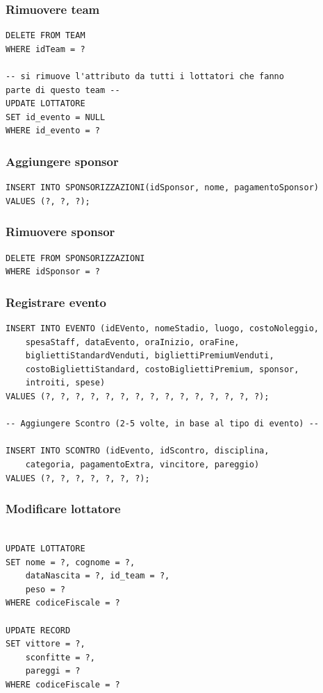 \documentclass[a4paper,12pt]{report}
\begin{document}
\subsubsection{Rimuovere team}
\begin{verbatim}
DELETE FROM TEAM 
WHERE idTeam = ?

-- si rimuove l'attributo da tutti i lottatori che fanno 
parte di questo team --
UPDATE LOTTATORE
SET id_evento = NULL
WHERE id_evento = ?
\end{verbatim}
\subsubsection{Aggiungere sponsor}
\begin{verbatim}
INSERT INTO SPONSORIZZAZIONI(idSponsor, nome, pagamentoSponsor)
VALUES (?, ?, ?);
\end{verbatim}
\subsubsection{Rimuovere sponsor}
\begin{verbatim}
DELETE FROM SPONSORIZZAZIONI
WHERE idSponsor = ?
\end{verbatim}
\subsubsection{Registrare evento}
\begin{verbatim}
INSERT INTO EVENTO (idEVento, nomeStadio, luogo, costoNoleggio,
    spesaStaff, dataEvento, oraInizio, oraFine, 
    bigliettiStandardVenduti, bigliettiPremiumVenduti, 
    costoBigliettiStandard, costoBigliettiPremium, sponsor, 
    introiti, spese)
VALUES (?, ?, ?, ?, ?, ?, ?, ?, ?, ?, ?, ?, ?, ?, ?);

-- Aggiungere Scontro (2-5 volte, in base al tipo di evento) --

INSERT INTO SCONTRO (idEvento, idScontro, disciplina, 
    categoria, pagamentoExtra, vincitore, pareggio)
VALUES (?, ?, ?, ?, ?, ?, ?);

\end{verbatim}
\subsubsection{Modificare lottatore}
\begin{verbatim}

UPDATE LOTTATORE 
SET nome = ?, cognome = ?,
    dataNascita = ?, id_team = ?, 
    peso = ?
WHERE codiceFiscale = ?

UPDATE RECORD 
SET vittore = ?,
    sconfitte = ?,
    pareggi = ?
WHERE codiceFiscale = ?
    
\end{verbatim}
\end{document}
